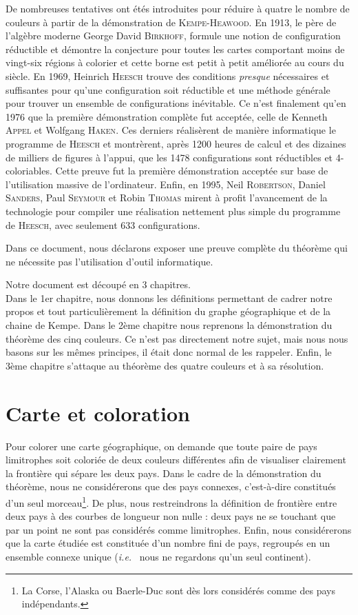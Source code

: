 De nombreuses tentatives ont étés introduites pour réduire à quatre le nombre de couleurs à partir de la démonstration de \textsc{Kempe-Heawood}. En 1913, le père de l'algèbre moderne George David \textsc{Birkhoff}, formule une notion de configuration réductible et démontre la conjecture pour toutes les cartes comportant moins de vingt-six régions à colorier et cette borne est petit à petit améliorée au cours du siècle. En 1969, Heinrich \textsc{Heesch} trouve des conditions \textit{presque} nécessaires et suffisantes pour qu'une configuration soit réductible et une méthode générale pour trouver un ensemble de configurations inévitable. Ce n'est finalement qu'en 1976 que la première démonstration complète fut acceptée, celle de Kenneth \textsc{Appel} et Wolfgang \textsc{Haken}. Ces derniers réalisèrent de manière informatique le programme de \textsc{Heesch} et montrèrent, après 1200 heures de calcul et des dizaines de milliers de figures à l'appui, que les 1478 configurations sont réductibles et 4-coloriables. Cette preuve fut la première démonstration acceptée sur base de l'utilisation massive de l'ordinateur. Enfin, en 1995, Neil \textsc{Robertson}, Daniel \textsc{Sanders}, Paul \textsc{Seymour} et Robin \textsc{Thomas} mirent à profit l'avancement de la technologie pour compiler une réalisation nettement plus simple du programme de \textsc{Heesch}, avec seulement 633 configurations.

Dans ce document, nous déclarons exposer une preuve complète du théorème qui ne nécessite pas l'utilisation d'outil informatique.

Notre document est découpé en 3 chapitres.\\
Dans le 1er chapitre, nous donnons les définitions permettant de cadrer notre propos et tout particulièrement la définition du graphe géographique et de la chaine de Kempe.
Dans le 2ème chapitre nous reprenons la démonstration du théorème des cinq couleurs. Ce n'est pas directement notre sujet, mais nous nous basons sur les mêmes principes, il était donc normal de les rappeler. Enfin, le 3ème chapitre s’attaque au théorème des quatre couleurs et à sa résolution.

\section{Carte et coloration}

Pour colorer une carte géographique, on demande que toute paire de pays limitrophes soit coloriée de deux couleurs différentes afin de visualiser clairement la frontière qui sépare les deux pays. Dans le cadre de la démonstration du théorème, nous ne considérerons que des pays connexes, c'est-à-dire constitués d'un seul morceau\footnote{La Corse, l'Alaska ou Baerle-Duc sont dès lors considérés comme des pays indépendants.}. De plus, nous restreindrons la définition de frontière entre deux pays à des courbes de longueur non nulle : deux pays ne se touchant que par un point ne sont pas considérés comme limitrophes. Enfin, nous considérerons que la carte étudiée est constituée d'un nombre fini de pays, regroupés en un ensemble connexe unique (\textit{i.e.}~ nous ne regardons qu'un seul continent).

